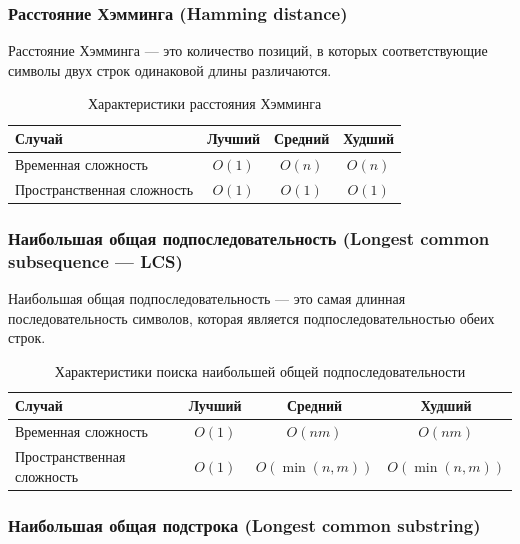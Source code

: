 \documentclass[a4paper,12pt]{article}
\begin{document}
\subsubsection{Расстояние Хэмминга (Hamming distance)}
\label{subsubsec:расстояние-хэмминга-hamming-distance}

Расстояние Хэмминга --- это количество позиций, в которых соответствующие символы двух строк одинаковой длины различаются.

\begin{table}[H]
    \centering
    \begin{tabular}{|l|c|c|c|}
        \hline
        Случай & Лучший & Средний & Худший \\
        \hline
        Временная сложность & $O(1)$ & $O(n)$ & $O(n)$ \\
        \hline
        Пространственная сложность & $O(1)$ & $O(1)$ & $O(1)$ \\
        \hline
    \end{tabular}
    \caption{Характеристики расстояния Хэмминга}
\end{table}

\subsubsection{Наибольшая общая подпоследовательность (Longest common subsequence — LCS)}
\label{subsubsec:наибольшая-общая-подпоследовательность-longest-common-subsequence-lcs}

Наибольшая общая подпоследовательность --- это самая длинная последовательность символов, которая является подпоследовательностью обеих строк.

\begin{table}[H]
    \centering
    \begin{tabular}{|l|c|c|c|}
        \hline
        Случай & Лучший & Средний & Худший \\
        \hline
        Временная сложность & $O(1)$ & $O(nm)$ & $O(nm)$ \\
        \hline
        Пространственная сложность & $O(1)$ & $O(\min(n, m))$ & $O(\min(n, m))$ \\
        \hline
    \end{tabular}
    \caption{Характеристики поиска наибольшей общей подпоследовательности}
\end{table}

\subsubsection{Наибольшая общая подстрока (Longest common substring)}
\label{subsubsec:наибольшая-общая-подстрока-longest-common-substring}
\end{document}
